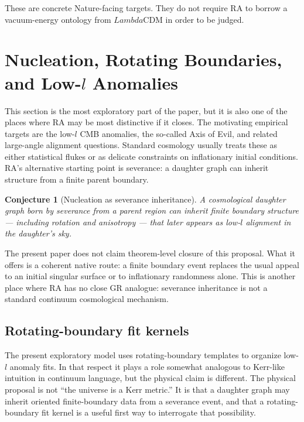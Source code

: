 \documentclass[11pt]{article}
\def\ell{l}%
\def\Lambda{Lambda}%
\newtheorem{conjecture}{Conjecture}
\begin{document}
These are concrete Nature-facing targets. They do not require RA to borrow a vacuum-energy ontology from $\Lambda$CDM in order to be judged.

\section{Nucleation, Rotating Boundaries, and Low-\texorpdfstring{$\ell$}{l} Anomalies}
\label{sec:nucleation}

This section is the most exploratory part of the paper, but it is also one of the places where RA may be most distinctive if it closes. The motivating empirical targets are the low-$\ell$ CMB anomalies, the so-called Axis of Evil, and related large-angle alignment questions. Standard cosmology usually treats these as either statistical flukes or as delicate constraints on inflationary initial conditions. RA's alternative starting point is severance: a daughter graph can inherit structure from a finite parent boundary.

\begin{conjecture}[Nucleation as severance inheritance]
A cosmological daughter graph born by severance from a parent region can inherit finite boundary structure --- including rotation and anisotropy --- that later appears as low-$\ell$ alignment in the daughter's sky.
\end{conjecture}

The present paper does not claim theorem-level closure of this proposal. What it offers is a coherent native route: a finite boundary event replaces the usual appeal to an initial singular surface or to inflationary randomness alone. This is another place where RA has no close GR analogue: severance inheritance is not a standard continuum cosmological mechanism.

\subsection{Rotating-boundary fit kernels}

The present exploratory model uses rotating-boundary templates to organize low-$\ell$ anomaly fits. In that respect it plays a role somewhat analogous to Kerr-like intuition in continuum language, but the physical claim is different. The physical proposal is not ``the universe is a Kerr metric.'' It is that a daughter graph may inherit oriented finite-boundary data from a severance event, and that a rotating-boundary fit kernel is a useful first way to interrogate that possibility.
\end{document}

